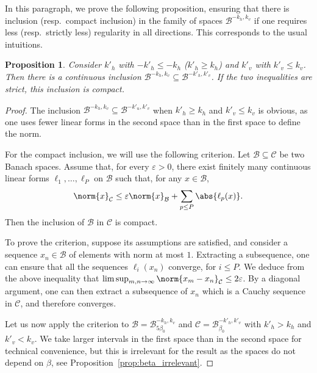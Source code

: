 \documentclass[JEP,XML,SOM,Unicode]{cedram}
\newcommand{\boC}{\mathcal{C}}
\newcommand{\boB}{\mathcal{B}}
\let\epsilon\varepsilon
\newtheorem{prop}[thm]{Proposition}
\theoremstyle{definition}
\numberwithin{equation}{section}
\begin{document}
In this paragraph, we prove the following proposition, ensuring that there
is inclusion (resp.\ compact inclusion) in the family of spaces $\boB^{-k_h, k_v}$
if one requires less (resp.\ strictly less) regularity in all directions.
This corresponds to the usual intuitions.

\begin{prop}
\label{prop:compact_inclusion} Consider $k'_h$ with $-k'_h \leq -k_h$ (\ie $k'_h \geq k_h$) and $k'_v$ with $k'_v \leq k_v$. Then there is a continuous
inclusion $\boB^{-k_h, k_v} \subseteq \boB^{-k'_h, k'_v}$. If the two
inequalities are strict, this inclusion is compact.
\end{prop}
\begin{proof}
The inclusion $\boB^{-k_h, k_v} \subseteq \boB^{-k'_u, k'_v}$ when $k'_h \geq
k_h$ and $k'_v \leq k_v$ is obvious, as one uses fewer linear forms in the
second space than in the first space to define the norm.

For the compact inclusion, we will use the following criterion. Let $\boB
\subseteq \boC$ be two Banach spaces. Assume that, for every $\epsilon>0$,
there exist finitely many continuous linear forms $\ell_1,\dotsc,\ell_P$ on
$\boB$ such that, for any $x \in \boB$,
\begin{equation}
\label{eq:critere_compacite}
\norm{x}_{\boC} \leq \epsilon \norm{x}_{\boB} + \sum_{p \leq P} \abs{\ell_p(x)}.
\end{equation}
Then the inclusion of $\boB$ in $\boC$ is compact.

To prove the criterion, suppose its assumptions are satisfied, and consider a
sequence $x_n \in \boB$ of elements with norm at most $1$. Extracting a
subsequence, one can ensure that all the sequences $\ell_i(x_n)$ converge,
for $i\leq P$. We deduce from the above inequality that $\limsup_{m,n\to
\infty} \norm{x_m -x_n}_{\boC} \leq 2 \epsilon$. By a diagonal argument, one
can then extract a subsequence of $x_n$ which is a Cauchy sequence in $\boC$,
and therefore converges.

Let us now apply the criterion to $\boB = \boB^{-k_h, k_v}_{5\beta_0}$ and
$\boC = \boB^{-k'_h, k'_v}_{\beta_0}$ with $k'_h>k_h$ and $k'_v<k_v$. We take
larger intervals in the first space than in the second space for technical
convenience, but this is irrelevant for the result as the spaces do not
depend on $\beta$, see Proposition~\ref{prop:beta_irrelevant}.


\end{proof}
\end{document}

